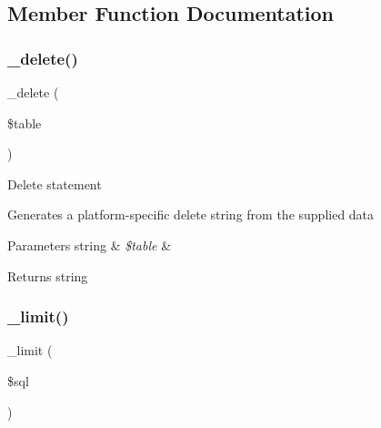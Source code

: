 \subsection{Member Function Documentation}
\mbox{\label{class_c_i___d_b__pdo__ibm__driver_a133ea8446ded52589bd22cc9163d0896}} 
\subsubsection{\texorpdfstring{\+\_\+delete()}{\_delete()}}
{\footnotesize\ttfamily \+\_\+delete (\begin{DoxyParamCaption}\item[{}]{\$table }\end{DoxyParamCaption})\hspace{0.3cm}{\ttfamily [protected]}}

Delete statement

Generates a platform-\/specific delete string from the supplied data


\begin{DoxyParams}[1]{Parameters}
string & {\em \$table} & \\
\hline
\end{DoxyParams}
\begin{DoxyReturn}{Returns}
string 
\end{DoxyReturn}
\mbox{\label{class_c_i___d_b__pdo__ibm__driver_a3a02ea06541b8ecc25a33a61651562c8}} 
\subsubsection{\texorpdfstring{\+\_\+limit()}{\_limit()}}
{\footnotesize\ttfamily \+\_\+limit (\begin{DoxyParamCaption}\item[{}]{\$sql }\end{DoxyParamCaption})\hspace{0.3cm}{\ttfamily [protected]}}

